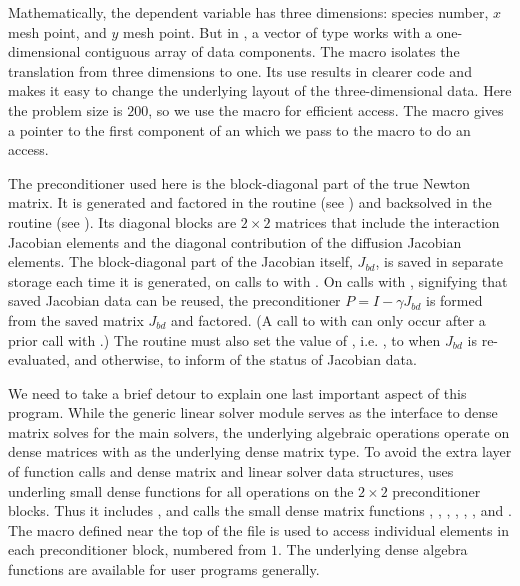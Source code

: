 Mathematically, the dependent variable has three dimensions: species
number, $x$ mesh point, and $y$ mesh point.  But in {\nvecs}, a vector of
type  works with a one-dimensional contiguous array of
data components. The macro  isolates the translation from
three dimensions to one. Its use results in clearer code and makes it
easy to change the underlying layout of the three-dimensional data. 
Here the problem size is $200$, so we use the  macro
for efficient  access.  The  macro gives
a pointer to the first component of an  which we pass to
the  macro to do an  access.

The preconditioner used here is the block-diagonal part of the true Newton
matrix.  It is generated and factored in the  routine 
(see ) and backsolved in the  routine 
(see ). Its diagonal blocks are $2 \times 2$
matrices that include the interaction Jacobian elements and the diagonal
contribution of the diffusion Jacobian elements.  The block-diagonal part of
the Jacobian itself, $J_{bd}$, is saved in separate storage each time it is
generated, on calls to  with .
On calls with , signifying that saved Jacobian data
can be reused, the preconditioner $P = I - \gamma J_{bd}$ is formed from the
saved matrix $J_{bd}$ and factored.  (A call to  with
 can only occur after a prior call with
.)  The  routine must also set the value
of , i.e. , to  when $J_{bd}$ is re-evaluated,
and  otherwise, to inform {\cvls} of the status of Jacobian data.

We need to take a brief detour to explain one last important aspect of
this program.  While the generic {\sunlinsoldense} linear solver
module serves as the interface to dense matrix solves for the main
{\sundials} solvers, the underlying algebraic operations operate on
dense matrices with  as the underlying dense matrix
type.  To avoid the extra layer of function calls and dense matrix and
linear solver data structures,  uses underling small
dense functions for all operations on the $2 \times 2$ preconditioner blocks.  
Thus it includes , and calls the small dense
matrix functions , , ,
, , , and
. The macro  defined near the top of the file
is used to access individual elements in each preconditioner block,
numbered from $1$.  The underlying dense algebra functions are
available for {\cvode} user programs
generally.%

